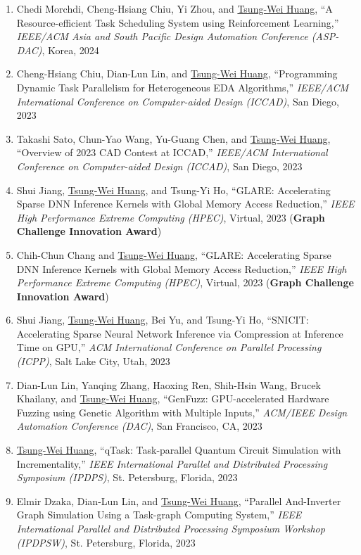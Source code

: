 \documentclass[A4,11pt]{article}
\begin{document}
\begin{enumerate}
    \item Chedi Morchdi, Cheng-Hsiang Chiu, Yi Zhou, and \underline{Tsung-Wei Huang}, ``A Resource-efficient Task Scheduling System using Reinforcement Learning,'' \textit{IEEE/ACM Asia and South Pacific Design Automation Conference (ASP-DAC)}, Korea, 2024
    \item Cheng-Hsiang Chiu, Dian-Lun Lin, and \underline{Tsung-Wei Huang}, ``Programming Dynamic Task Parallelism for Heterogeneous EDA Algorithms,'' \textit{IEEE/ACM International Conference on Computer-aided Design (ICCAD)}, San Diego, 2023
    \item Takashi Sato, Chun-Yao Wang, Yu-Guang Chen, and \underline{Tsung-Wei Huang}, ``Overview of 2023 CAD Contest at ICCAD,'' \textit{IEEE/ACM International Conference on Computer-aided Design (ICCAD)}, San Diego, 2023
    \item Shui Jiang, \underline{Tsung-Wei Huang}, and Tsung-Yi Ho, ``GLARE: Accelerating Sparse DNN Inference Kernels with Global Memory Access Reduction,'' \textit{IEEE High Performance Extreme Computing (HPEC)}, Virtual, 2023 (\textbf{Graph Challenge Innovation Award})
    \item Chih-Chun Chang and \underline{Tsung-Wei Huang}, ``GLARE: Accelerating Sparse DNN Inference Kernels with Global Memory Access Reduction,'' \textit{IEEE High Performance Extreme Computing (HPEC)}, Virtual, 2023 (\textbf{Graph Challenge Innovation Award})
    \item Shui Jiang, \underline{Tsung-Wei Huang}, Bei Yu, and Tsung-Yi Ho, ``SNICIT: Accelerating Sparse Neural Network Inference via Compression at Inference Time on GPU,'' \textit{ACM International Conference on Parallel Processing (ICPP)}, Salt Lake City, Utah, 2023
    \item Dian-Lun Lin, Yanqing Zhang, Haoxing Ren, Shih-Hsin Wang, Brucek Khailany, and \underline{Tsung-Wei Huang}, ``GenFuzz: GPU-accelerated Hardware Fuzzing using Genetic Algorithm with Multiple Inputs,'' \textit{ACM/IEEE Design Automation Conference (DAC)}, San Francisco, CA, 2023
    \item \underline{Tsung-Wei Huang}, ``qTask: Task-parallel Quantum Circuit Simulation with Incrementality,'' \textit{IEEE International Parallel and Distributed Processing Symposium (IPDPS)}, St. Petersburg, Florida, 2023 
    \item Elmir Dzaka, Dian-Lun Lin, and \underline{Tsung-Wei Huang}, ``Parallel And-Inverter Graph Simulation Using a Task-graph Computing System,'' \textit{IEEE International Parallel and Distributed Processing Symposium Workshop (IPDPSW)}, St. Petersburg, Florida, 2023 

\end{enumerate}
\end{document}
